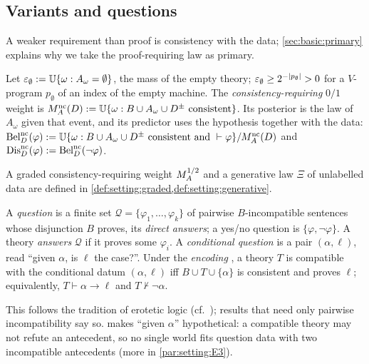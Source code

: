 \subsection{Variants and questions}\label{sec:setting:variants}

A weaker requirement than proof is consistency with the data; \cref{sec:basic:primary} explains why we take the proof-requiring law as primary.

\begin{definition}[Variants]\label{def:setting:variants}
Let $\varepsilon_{\emptyset}:=\mathbb{U}\{\omega:A_\omega=\emptyset\}$, the mass of the empty theory; $\varepsilon_{\emptyset}\ge2^{-\lvert p_\emptyset\rvert}>0$ for a $V$-program $p_\emptyset$ of an index of the empty machine. The \emph{consistency-requiring} $0/1$ weight is $M_{A}^{\mathrm{nc}}(D):=\mathbb{U}\{\omega:B\cup A_\omega\cup D^\pm\text{ consistent}\}$. Its posterior is the law of $A_\omega$ given that event, and its predictor uses the hypothesis together with the data: $\mathrm{Bel}^{\mathrm{nc}}_D(\varphi):=\mathbb{U}\{\omega:B\cup A_\omega\cup D^\pm\text{ consistent and }\vdash\varphi\}/M_{A}^{\mathrm{nc}}(D)$ and $\mathrm{Dis}^{\mathrm{nc}}_D(\varphi):=\mathrm{Bel}^{\mathrm{nc}}_D(\neg\varphi)$.
\end{definition}

A graded consistency-requiring weight $M_{A}^{1/2}$ and a generative law $\Xi$ of unlabelled data are defined in \cref{def:setting:graded,def:setting:generative}.

\begin{definition}[Questions]\label{def:setting:questions}
A \emph{question} is a finite set $\mathcal Q=\{\varphi_1,\dots,\varphi_k\}$ of pairwise $B$-incompatible sentences whose disjunction $B$ proves, its \emph{direct answers}; a yes/no question is $\{\varphi,\neg\varphi\}$. A theory \emph{answers} $\mathcal Q$ if it proves some $\varphi_i$. A \emph{conditional question} is a pair $(\alpha,\ell)$, read ``given $\alpha$, is $\ell$ the case?''. Under the \emph{encoding} \Ethree, a theory $T$ is compatible with the conditional datum $(\alpha,\ell)$ iff $B\cup T\cup\{\alpha\}$ is consistent and proves $\ell$; equivalently, $T\vdash\alpha\to\ell$ and $T\nvdash\neg\alpha$.
\end{definition}

This follows the tradition of erotetic logic (cf.\ \citealp{belnap1976logic}); results that need only pairwise incompatibility say so. \Ethree{} makes ``given $\alpha$'' hypothetical: a compatible theory may not refute an antecedent, so no single world fits question data with two incompatible antecedents (more in \cref{par:setting:E3}).
